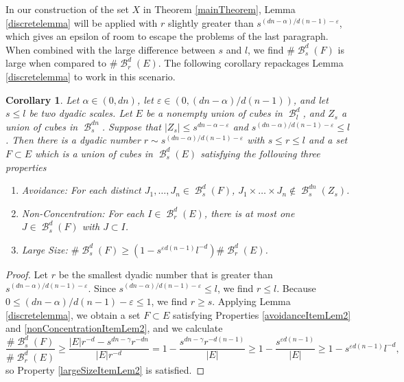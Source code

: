\documentclass[dvipsnames,letterpaper,12pt]{article}
\numberwithin{equation}{section}
\theoremstyle{plain}
\newtheorem{corollary}{Corollary}
\DeclareMathOperator{\B}{\mathcal{B}}
\begin{document}
In our construction of the set $X$ in Theorem \ref{mainTheorem}, Lemma \ref{discretelemma} will be applied with $r$ slightly greater than $s^{(dn - \alpha)/d(n-1) - \varepsilon}$, which gives an epsilon of room to escape the problems of the last paragraph. When combined with the large difference between $s$ and $l$, we find $\# \B^d_s(F)$ is large when compared to $\# \B^d_r(E)$. The following corollary repackages Lemma \ref{discretelemma} to work in this scenario.

\begin{corollary} \label{ratiobound}
	Let $\alpha \in (0,dn)$, let $\varepsilon \in (0,(dn - \alpha)/d(n-1))$, and let $s \leq l$ be two dyadic scales. Let $E$ be a nonempty union of cubes in $\B^d_l$, and $Z_s$ a union of cubes in $\B^{dn}_s$. Suppose that $|Z_s| \leq s^{dn-\alpha-\varepsilon}$ and $s^{(dn - \alpha)/d(n-1) - \varepsilon} \leq l$. Then there is a dyadic number $r \sim s^{(dn - \alpha)/d(n-1) - \varepsilon}$ with $s \leq r \leq l$ and a set $F \subset E$ which is a union of cubes in $\B^d_s(E)$ satisfying the following three properties
	\begin{enumerate}
		\item \label{avoidanceItemLem2} \emph{Avoidance}: For each distinct $J_1, \dots, J_n \in \B^d_s(F)$, $J_1 \times \dots \times J_n \not \in \B_s^{dn}(Z_s)$.
		\item \label{nonConcentrationItemLem2} \emph{Non-Concentration}: For each $I \in \B_r^d(E)$, there is at most one $J \in \B_s^d(F)$ with $J \subset I$.
		\item \label{largeSizeItemLem2} \emph{Large Size}: $\# \B_s^d(F) \geq (1 - s^{\varepsilon d(n-1)} l^{-d}) \# \B_r^d(E)$.
	\end{enumerate}
\end{corollary}
\begin{proof}
	Let $r$ be the smallest dyadic number that is greater than $s^{(dn - \alpha)/d(n-1) - \varepsilon}$. Since $s^{(dn - \alpha)/d(n-1) - \varepsilon} \leq l$, we find $r \leq l$. Because $0 \leq (dn - \alpha)/d(n-1) - \varepsilon \leq 1$, we find $r \geq s$. Applying Lemma \ref{discretelemma}, we obtain a set $F \subset E$ satisfying Properties \ref{avoidanceItemLem2} and \ref{nonConcentrationItemLem2}, and we calculate
	\[ \frac{\# \B_s^d(F)}{\# \B_r^d(E)} \geq \frac{|E| r^{-d} - s^{dn - \gamma} r^{-dn}}{|E| r^{-d}} = 1 - \frac{s^{dn - \gamma} r^{-d(n-1)}}{|E|} \geq 1 - \frac{s^{\varepsilon d(n-1)}}{|E|} \geq 1 - s^{\varepsilon d(n-1)}l^{-d}, \]
	so Property \ref{largeSizeItemLem2} is satisfied.
\end{proof}
\end{document}
